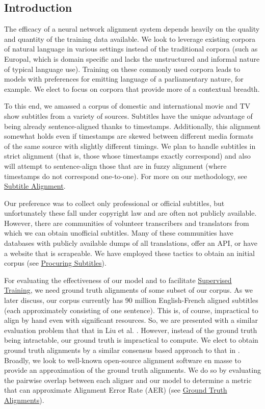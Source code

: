 \documentclass[twoside,twocolumn]{article}
\begin{document}
\subsection{Introduction}

The efficacy of a neural network alignment system depends heavily on the
quality and quantity of the training data available. We look to leverage
existing corpora of natural language in various settings instead of the
traditional corpora (such as Europal, which is domain specific and lacks the
unstructured and informal nature of typical language use). Training on these
commonly used corpora leads to models with preferences for emitting language
of a parliamentary nature, for example. We elect to focus on corpora that
provide more of a contextual breadth.

To this end, we amassed a corpus of domestic and international movie and TV
show subtitles from a variety of sources. Subtitles have the unique advantage
of being already sentence-aligned thanks to timestamps. Additionally, this
alignment somewhat holds even if timestamps are skewed between different media
formats of the same source with slightly different timings. We plan to handle
subtitles in strict alignment (that is, those whose timestamps exactly
correspond) and also will attempt to sentence-align those that are in fuzzy
alignment (where timestamps do not correspond one-to-one). For more on our
methodology, see \hyperref[subsec:subtitle-alignment]{Subtitle Alignment}.

Our preference was to collect only professional or official subtitles, but
unfortunately these fall under copyright law and are often not publicly
available. However, there are communities of volunteer transcribers and
translators from which we can obtain unofficial subtitles. Many of these
communities have databases with publicly available dumps of all translations,
offer an API, or have a website that is scrapeable. We have employed these
tactics to obtain an initial corpus (see
\hyperref[subsec:procuring-subtitles]{Procuring Subtitles}).

For evaluating the effectiveness of our model and to facilitate
\hyperref[sec:supervised-training]{Supervised Training}, we need ground truth
alignments of some subset of our corpus. As we later discuss, our corpus
currently has 90 million English-French aligned subtitles (each approximately
consisting of one sentence). This is, of course, impractical to align by hand
even with significant resources. So, we are presented with a similar evaluation
problem that that in Liu et al. \cite{liu2015streaming}. However, instead of
the ground truth being intractable, our ground truth is impractical to compute.
We elect to obtain ground truth alignments by a similar consensus based
approach to that in \cite{liu2015streaming}. Broadly, we look to well-known
open-source alignment software en masse to provide an approximation of the
ground truth alignments. We do so by evaluating the pairwise overlap between
each aligner and our model to determine a metric that can approximate
Alignment Error Rate (AER) (see
\hyperref[subsec:ground-truth-alignments]{Ground Truth Alignments}).
\end{document}
